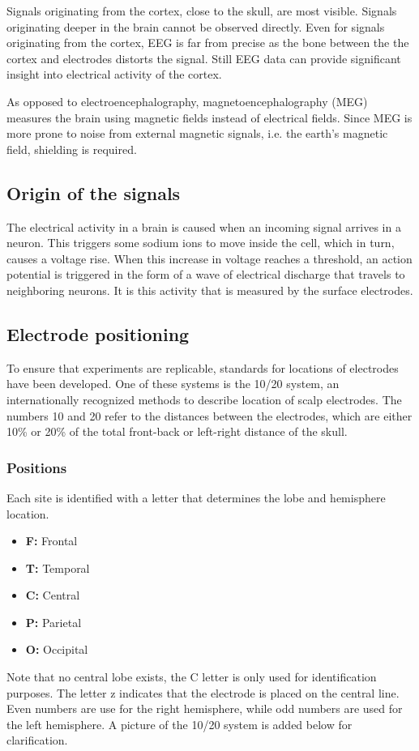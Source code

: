\npar

Signals originating from the cortex, close to the skull, are most visible. Signals originating deeper in the brain cannot be observed directly. Even for signals originating from the cortex, EEG is far from precise as the bone between the the cortex and electrodes distorts the signal. Still EEG data can provide significant insight into electrical activity of the cortex.

\npar

As opposed to electroencephalography, magnetoencephalography (MEG) measures the brain using magnetic fields instead of electrical fields. Since MEG is more prone to noise from external magnetic signals, i.e. the earth's magnetic field, shielding is required.

\subsection{Origin of the signals}

The electrical activity in a brain is caused when an incoming signal arrives in a neuron. This triggers some sodium ions to move inside the cell, which in turn, causes a voltage rise\cite{ExtendedPaper}. When this increase in voltage reaches a threshold, an action potential is triggered in the form of a wave of electrical discharge that travels to neighboring neurons. It is this activity that is measured by the surface electrodes.

\subsection{Electrode positioning}
To ensure that experiments are replicable, standards for locations of electrodes have been developed. One of these systems is the 10/20 system, an internationally recognized methods to describe location of scalp electrodes\cite{TenTwentyManual}. The numbers 10 and 20 refer to the distances between the electrodes, which are either 10\% or 20\% of the total front-back or left-right distance of the skull.

\subsubsection{Positions}
Each site is identified with a letter that determines the lobe and hemisphere location.
\begin{itemize}
\item \textbf{F:} Frontal
\item \textbf{T:} Temporal
\item \textbf{C:} Central
\item \textbf{P:} Parietal
\item \textbf{O:} Occipital
\end{itemize}
Note that no central lobe exists, the C letter is only used for identification purposes. The letter z indicates that the electrode is placed on the central line. Even numbers are use for the right hemisphere, while odd numbers are used for the left hemisphere. A picture of the 10/20 system is added below for clarification.

